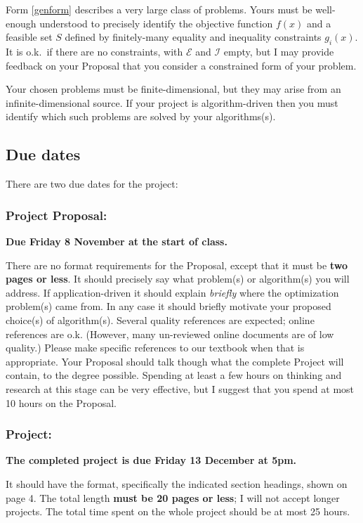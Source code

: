 \documentclass[12pt]{amsart}
\begin{document}
Form \eqref{genform} describes a very large class of problems.  Yours must be well-enough understood to precisely identify the objective function $f(x)$ and a feasible set $S$ defined by finitely-many equality and inequality constraints $g_i(x)$.  It is o.k.~if there are no constraints, with $\mathcal{E}$ and $\mathcal{I}$ empty, but I may provide feedback on your Proposal that you consider a constrained form of your problem.

Your chosen problems must be finite-dimensional, but they may arise from an infinite-dimensional source.  If your project is algorithm-driven then you must identify which such problems are solved by your algorithms(s).


\subsection*{Due dates}  There are two due dates for the project:

\subsubsection*{Project Proposal:}  \textbf{Due Friday 8 November at the start of class.}

\smallskip
\noindent There are no format requirements for the Proposal, except that it must be \textbf{two pages or less}.  It should precisely say what problem(s) or algorithm(s) you will address.  If application-driven it should explain \emph{briefly} where the optimization problem(s) came from.  In any case it should briefly motivate your proposed choice(s) of algorithm(s).  Several quality references are expected; online references are o.k.  (However, many un-reviewed online documents are of low quality.)  Please make specific references to our textbook when that is appropriate.  Your Proposal should talk though what the complete Project will contain, to the degree possible.  Spending at least a few hours on thinking and research at this stage can be very effective, but I suggest that you spend at most 10 hours on the Proposal.

\subsubsection*{Project:}  \textbf{The completed project is due Friday 13 December at 5pm.}

\smallskip
\noindent It should have the format, specifically the indicated section headings, shown on page 4.  The total length \textbf{must be 20 pages or less}; I will not accept longer projects.  The total time spent on the whole project should be at most 25 hours.
\end{document}
